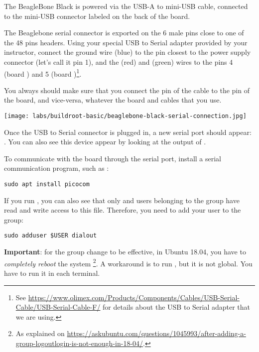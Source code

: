 The BeagleBone Black is powered via the USB-A to mini-USB cable,
connected to the mini-USB connector labeled  on the back of
the board.

The Beaglebone serial connector is exported on the 6 male pins close
to one of the 48 pins headers. Using your special USB to Serial
adapter provided by your instructor, connect the ground wire (blue) to
the pin closest to the power supply connector (let's call it pin 1),
and the  (red) and  (green) wires to the pins 4
(board ) and 5 (board )\footnote{See
  \url{https://www.olimex.com/Products/Components/Cables/USB-Serial-Cable/USB-Serial-Cable-F/}
  for details about the USB to Serial adapter that we are using.}.

You always should make sure that you connect the  pin of the
cable to the  pin of the board, and vice-versa, whatever the
board and cables that you use.

\begin{center}
\texttt{[image: labs/buildroot-basic/beaglebone-black-serial-connection.jpg]}
\end{center}

Once the USB to Serial connector is plugged in, a new serial port
should appear: .  You can also see this device
appear by looking at the output of .

To communicate with the board through the serial port, install a
serial communication program, such as :

\begin{verbatim}
sudo apt install picocom
\end{verbatim}

If you run , you can also see that only
 and users belonging to the  group have read
and write access to this file. Therefore, you need to add your user to
the  group:

\begin{verbatim}
sudo adduser $USER dialout
\end{verbatim}

{\bf Important}: for the group change to be effective, in Ubuntu 18.04, you have to
{\em completely reboot} the system \footnote{As explained on
\url{https://askubuntu.com/questions/1045993/after-adding-a-group-logoutlogin-is-not-enough-in-18-04/}.}.
A workaround is to run , but it is not global.
You have to run it in each terminal.

